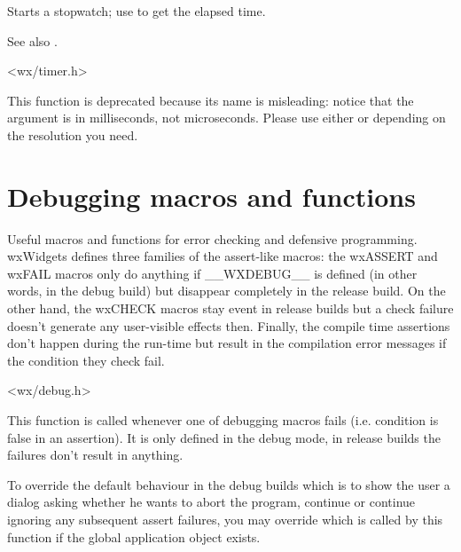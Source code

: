 
Starts a stopwatch; use  to get the elapsed time.

See also .


<wx/timer.h>


\label{wxusleep}


This function is deprecated because its name is misleading: notice that the
argument is in milliseconds, not microseconds. Please use either
 or 
depending on the resolution you need.



\section{Debugging macros and functions}\label{debugmacros}

Useful macros and functions for error checking and defensive programming.
wxWidgets defines three families of the assert-like macros:
the wxASSERT and wxFAIL macros only do anything if \_\_WXDEBUG\_\_ is defined
(in other words, in the debug build) but disappear completely in the release
build. On the other hand, the wxCHECK macros stay event in release builds but a
check failure doesn't generate any user-visible effects then. Finally, the
compile time assertions don't happen during the run-time but result in the
compilation error messages if the condition they check fail.


<wx/debug.h>


\label{wxonassert}


This function is called whenever one of debugging macros fails (i.e. condition
is false in an assertion). It is only defined in the debug mode, in release
builds the  failures don't result in anything.

To override the default behaviour in the debug builds which is to show the user
a dialog asking whether he wants to abort the program, continue or continue
ignoring any subsequent assert failures, you may override
 which is called by this function if
the global application object exists.


